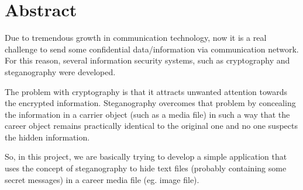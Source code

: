 \section*{Abstract}

Due to tremendous growth in communication technology, now it is a real
challenge to send some confidential data/information via communication
network. For this reason, several information security systems, such as
cryptography and steganography were developed.

The problem with cryptography is that it attracts unwanted attention
towards the encrypted information. Steganography overcomes that problem
by concealing the information in a carrier object (such as a media file)
in such a way that the career object remains practically identical to
the original one and no one suspects the hidden information.

So, in this project, we are basically trying to develop a simple
application that uses the concept of steganography to hide text files
(probably containing some secret messages) in a career media file
(eg. image file).
